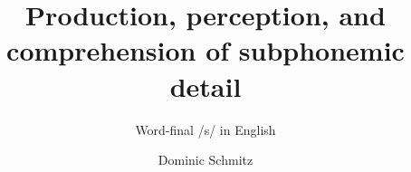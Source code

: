 \author{Dominic Schmitz} %
\title{Production, perception, and comprehension of subphonemic detail}
\subtitle{Word-final /s/ in English}
\renewcommand{\lsSeries}{} 
\newcommand{\lsSeriesTitle}{} 
\newcommand{\lsSeriesColor}{purple} 
\renewcommand{\lsSeriesNumber}{} 